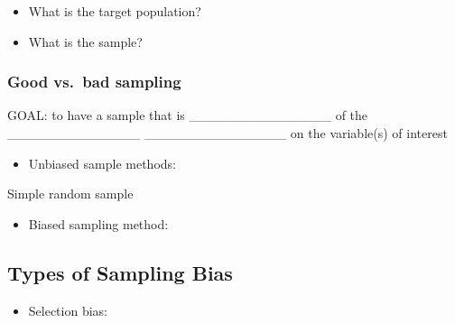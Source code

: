 \documentclass[
]{report}
\providecommand{\tightlist}{%
  \setlength{\itemsep}{0pt}\setlength{\parskip}{0pt}}
\newcommand{\rgi}{\hspace{24pt}}  %
\begin{document}
\begin{itemize}
\tightlist
\item
  What is the target population?
\end{itemize}

\vspace{0.2in}

\begin{itemize}
\tightlist
\item
  What is the sample?
\end{itemize}

\vspace{0.2in}

\subsubsection*{Good vs.~bad sampling}\label{good-vs.-bad-sampling}


GOAL: to have a sample that is \_\_\_\_\_\_\_\_\_\_\_\_\_\_\_ of the
\_\_\_\_\_\_\_\_\_\_\_\_\_\_ \_\_\_\_\_\_\_\_\_\_\_\_\_\_\_ on the variable(s) of interest


\begin{itemize}
\tightlist
\item
  Unbiased sample methods:
\end{itemize}

\vspace{0.5in}

\rgi \rgi Simple random sample

\begin{itemize}
\tightlist
\item
  Biased sampling method:
\end{itemize}

\vspace{0.5in}

\newpage

\subsection*{Types of Sampling Bias}\label{types-of-sampling-bias}

\begin{itemize}
\tightlist
\item
  Selection bias:
\end{itemize}
\end{document}
